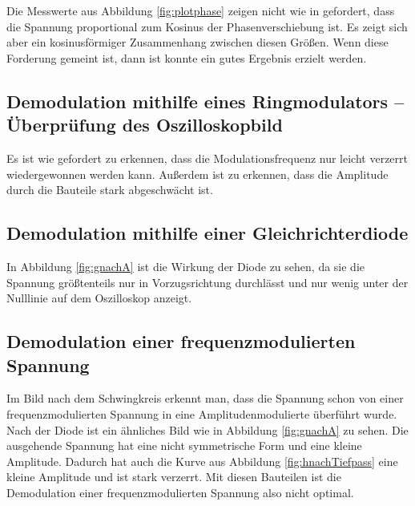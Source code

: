 Die Messwerte aus Abbildung \ref{fig:plotphase} zeigen nicht wie in \cite{anleitung} gefordert, dass die Spannung proportional zum Kosinus der Phasenverschiebung ist. Es zeigt sich aber ein kosinusförmiger Zusammenhang zwischen diesen Größen. Wenn diese Forderung gemeint ist, dann ist konnte ein gutes Ergebnis erzielt werden.


\subsection{Demodulation mithilfe eines Ringmodulators -- Überprüfung des Oszilloskopbild}

Es ist wie gefordert zu erkennen, dass die Modulationsfrequenz nur leicht verzerrt wiedergewonnen werden kann. Außerdem ist zu erkennen, dass die Amplitude durch die Bauteile stark abgeschwächt ist.

\subsection{Demodulation mithilfe einer Gleichrichterdiode}

In Abbildung \ref{fig:gnachA} ist die Wirkung der Diode zu sehen, da sie die Spannung größtenteils nur in Vorzugsrichtung durchlässt und nur wenig unter der Nulllinie auf dem Oszilloskop anzeigt. 


\subsection{Demodulation einer frequenzmodulierten Spannung}

Im Bild nach dem Schwingkreis erkennt man, dass die Spannung schon von einer frequenzmodulierten Spannung in eine Amplitudenmodulierte überführt wurde.
Nach der Diode ist ein ähnliches Bild wie in Abbildung \ref{fig:gnachA} zu sehen. Die ausgehende Spannung hat eine nicht symmetrische Form und eine kleine Amplitude. Dadurch hat auch die Kurve aus Abbildung \ref{fig:hnachTiefpass} eine kleine Amplitude und ist stark verzerrt. Mit diesen Bauteilen ist die Demodulation einer frequenzmodulierten Spannung also nicht optimal.
